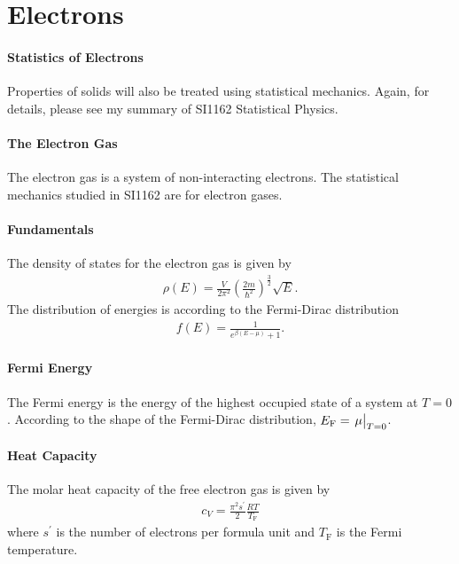 \section{Electrons}

\paragraph{Statistics of Electrons}
Properties of solids will also be treated using statistical mechanics. Again, for details, please see my summary of SI1162 Statistical Physics.

\paragraph{The Electron Gas}
The electron gas is a system of non-interacting electrons. The statistical mechanics studied in SI1162 are for electron gases.

\paragraph{Fundamentals}
The density of states for the electron gas is given by
\begin{align*}
	\rho(E) = \frac{V}{2\pi^{2}}\left(\frac{2m}{\hbar^{2}}\right)^{\frac{3}{2}}\sqrt{E}.
\end{align*}
The distribution of energies is according to the Fermi-Dirac distribution
\begin{align*}
	f(E) = \frac{1}{e^{\beta(E - \mu)} + 1}.
\end{align*}

\paragraph{Fermi Energy}
The Fermi energy is the energy of the highest occupied state of a system at $T = 0$. According to the shape of the Fermi-Dirac distribution, $E_{\text{F}} = \eval{\mu}_{T = 0}$.

\paragraph{Heat Capacity}
The molar heat capacity of the free electron gas is given by
\begin{align*}
	c_{V} = \frac{\pi^{2}s^{\prime}}{2}\frac{RT}{T_{\text{F}}}
\end{align*}
where $s^{\prime}$ is the number of electrons per formula unit and $T_{\text{F}}$ is the Fermi temperature.
	
